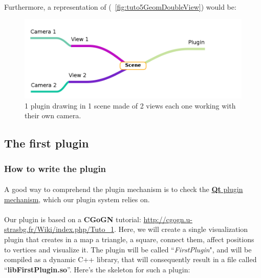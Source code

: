 \documentclass[a4paper]{scrreprt}
\begin{document}
	\paragraph{}
	Furthermore, a representation of (~\ref{fig:tuto5GeomDoubleView}) would be:
	\begin{figure}[h!p]
		\centering
		\includegraphics[width=1\textwidth]{images/systemMap2}
		\caption{1 plugin drawing in 1 scene made of 2 views each one working with
		their own camera.}
	\end{figure}
	\FloatBarrier

\subsection{The first plugin}
	\subsubsection{How to write the plugin}
	\paragraph{}
	A good way to comprehend the plugin mechanism is to check the
	\href{http://qt-project.org/doc/qt-4.8/plugins-howto.html}{\textbf{Qt} plugin
	mechanism}, which our plugin system relies on.
	\paragraph{}
	Our plugin is based on a \textbf{CGoGN} tutorial:
	\url{http://cgogn.u-strasbg.fr/Wiki/index.php/Tuto_1}. Here, we will create a
	single visualization plugin that creates in a map a triangle, a square,
	connect them, affect positions to vertices and visualize it. The plugin
	will be called ``\textit{FirstPlugin}", and will be compiled  as a
	dynamic C++ library, that will consequently result in a file called
	``\textbf{libFirstPlugin.so}''. Here's the skeleton for such a plugin:
\end{document}
